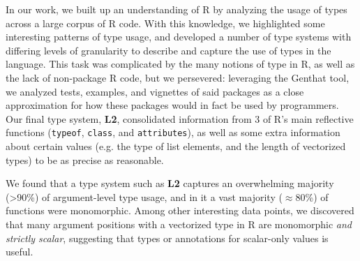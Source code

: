 \documentclass[acmsmall,10pt,review,anonymous]{acmart}\settopmatter{printfolios=true,printccs=false,printacmref=false}
\newcommand{\code}[1]{\lstinline|#1|\xspace}
\newcommand{\genthat}{{\sc Genthat}\xspace}
\begin{document}
In our work, we built up an understanding of R by analyzing the usage of types across a large corpus of R code.
With this knowledge, we highlighted some interesting patterns of type usage, and developed a number of type systems with differing levels of granularity to describe and capture the use of types in the language.
This task was complicated by the many notions of type in R, as well as the lack of non-package R code, but we persevered:
leveraging the \genthat tool, we analyzed tests, examples, and vignettes of said packages as a close approximation for how these packages would in fact be used by programmers.
Our final type system, {\bf L2}, consolidated information from 3 of R's main reflective functions (\code{typeof}, \code{class}, and \code{attributes}), as well as some extra information about certain values (e.g. the type of list elements, and the length of vectorized types) to be as precise as reasonable.

We found that a type system such as {\bf L2} captures an overwhelming majority (>90\%) of argument-level type usage, and in it a vast majority ($\approx$80\%) of functions were monomorphic.
Among other interesting data points, we discovered that many argument positions with a vectorized type in R are monomorphic {\it and strictly scalar}, suggesting that types or annotations for scalar-only values is useful.


%
%
%


\end{document}
